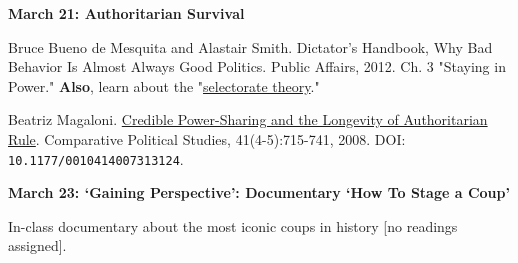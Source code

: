 \documentclass[letterpaper]{article}
\renewenvironment{itemize}{
  \begin{list}{}{
    \setlength{\leftmargin}{1.5em}
  }
}{
  \end{list}
}
\begin{document}
\begin{enumerate}
\begin{itemize}
	\item {\bf March 21: Authoritarian Survival}
			\begin{itemize}
				\item[$\bullet$] Bruce Bueno de Mesquita and Alastair Smith. Dictator's Handbook, Why Bad Behavior Is Almost Always Good Politics. Public Affairs, 2012. Ch. 3 "Staying in Power." {\bf Also}, learn about the "\href{https://www.youtube.com/watch?v=DON-aM2tze4}{selectorate theory}." 
				\item[$\bullet$] Beatriz Magaloni. \href{http://cps.sagepub.com/cgi/content/abstract/41/4-5/715}{Credible Power-Sharing and the Longevity of Authoritarian Rule}. Comparative Political Studies, 41(4-5):715-741, 2008. DOI: \texttt{10.1177/0010414007313124}.
			\end{itemize}
\end{itemize}



\begin{itemize}
	\item {\bf March 23: `Gaining Perspective': Documentary `How To Stage a Coup'}
			\begin{itemize}
				\item[$\bullet$] In-class documentary about the most iconic coups in history [no readings assigned].
			\end{itemize}
\end{itemize}


\vspace{2mm}


\vspace{1mm}




\end{enumerate}
\end{document}
